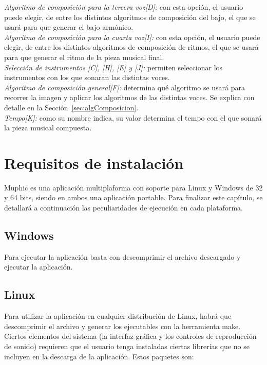 		\noindent\textit{Algoritmo de composición para la tercera voz[D]:} con esta opción, el usuario puede elegir, de entre los distintos algoritmos de composición del bajo, el que se usará para que generar el bajo armónico.\\
		
		\noindent\textit{Algoritmo de composición para la cuarta voz[I]:} con esta opción, el usuario puede elegir, de entre los distintos algoritmos de composición de ritmos, el que se usará para que generar el ritmo de la pieza musical final.\\
		
		\noindent\textit{Selección de instrumentos [C], [H], [E] y [J]:} permiten seleccionar los instrumentos con los que sonaran las distintas voces.\\

		\noindent\textit{Algoritmo de composición general[F]:} determina qué algoritmo se usará para recorrer la imagen y aplicar los algoritmos de las distintas voces. Se explica con detalle en la Sección~\ref{sec:algComposicion}.\\

		\noindent\textit{Tempo[K]:} como su nombre indica, su valor determina el tempo con el que sonará la pieza musical compuesta.\\
		
	\section{Requisitos de instalación}
	\label{sec:reqinstalacion}
	
		Muphic es una aplicación multiplaforma con soporte para Linux y Windows de 32 y 64 bits, siendo en ambos una aplicación portable. Para finalizar este capítulo, se detallará a continuación las peculiaridades de ejecución en cada plataforma.
		
		\subsection{Windows}
		
		Para ejecutar la aplicación basta con descomprimir el archivo descargado y ejecutar la aplicación.
		
		\subsection{Linux}
		
		Para utilizar la aplicación en cualquier distribución de Linux, habrá que descomprimir el archivo y generar los ejecutables con la herramienta make. Ciertos elementos del sistema (la interfaz gráfica y los controles de reproducción de sonido) requieren que el usuario tenga instaladas ciertas librerías que no se incluyen en la descarga de la aplicación. Estos paquetes son:
		
